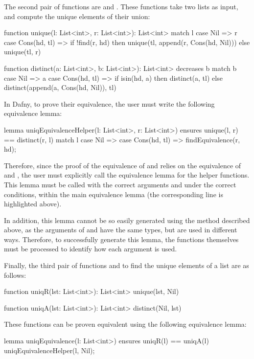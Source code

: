 The second pair of functions are  and . These functions take two lists as input, and compute the unique elements of their union:

\begin{dafny}
function unique(l: List<int>, r: List<int>): List<int>
{
  match l
  case Nil => r
  case Cons(hd, tl) =>
    if !find(r, hd) then unique(tl, append(r, Cons(hd, Nil)))
    else unique(tl, r)
}

function distinct(a: List<int>, b: List<int>): List<int>
  decreases b
{
  match b
  case Nil => a
  case Cons(hd, tl) =>
    if isin(hd, a) then distinct(a, tl)
    else distinct(append(a, Cons(hd, Nil)), tl)
}
\end{dafny}
%

In Dafny, to prove their equivalence, the user must write the following equivalence lemma:
\begin{dafny}[highlightlines=6]
lemma uniqEquivalenceHelper(l: List<int>, r: List<int>)
  ensures unique(l, r) == distinct(r, l)
{
  match l
  case Nil => {}
  case Cons(hd, tl) => findEquivalence(r, hd);
}
\end{dafny}
%

Therefore, since the proof of the equivalence of  and  relies on the equivalence of  and , the user must explicitly call the equivalence lemma for the helper functions. This lemma must be called with the correct arguments and under the correct conditions, within the main equivalence lemma (the corresponding line is highlighted above).

In addition, this lemma cannot be so easily generated using the method described above, as the arguments of  and  have the same types, but are used in different ways. Therefore, to successfully generate this lemma, the functions themselves must be processed to identify how each argument is used.

Finally, the third pair of functions  and  to find the unique elements of a list are as follows:

\begin{dafny}
function uniqR(lst: List<int>): List<int>
{
  unique(lst, Nil)
}

function uniqA(lst: List<int>): List<int>
{
  distinct(Nil, lst)
}
\end{dafny}
%
These functions can be proven equivalent using the following equivalence lemma:
\begin{dafny}
lemma uniqEquivalence(l: List<int>)
  ensures uniqR(l) == uniqA(l)
{
  uniqEquivalenceHelper(l, Nil);
}
\end{dafny}

